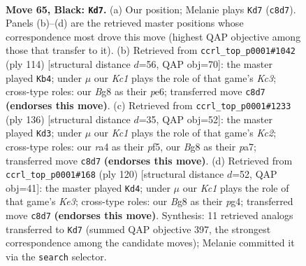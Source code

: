 \documentclass[11pt]{article}
\begin{document}
\clearpage

\begin{figure}[p]\centering
\begin{subfigure}{0.46\textwidth}\centering
\resizebox{\linewidth}{!}{%
\newchessgame
\chessboard[
  setfen={1rk3b1/p1p3r1/P1p3p1/2P2p1p/RP3P1P/6R1/5K2/1N6 b - - 53 65},
  showmover=false,
  pgfstyle=straightmove, color=movearrow, markmove={c8-d7}
]}
\caption{}
\end{subfigure}\hfill
\begin{subfigure}{0.46\textwidth}\centering
\resizebox{\linewidth}{!}{%
\newchessgame
\chessboard[
  setfen={r5r1/3pk3/4p1p1/4P2p/P2R1P1P/1PK3R1/8/8 w - - 11 58},
  showmover=false,
  pgfstyle=straightmove, color=movearrow, markmove={c3-b4}
]}
\caption{}
\end{subfigure}
\\[4pt]
\begin{subfigure}{0.46\textwidth}\centering
\resizebox{\linewidth}{!}{%
\newchessgame
\chessboard[
  setfen={8/p4k2/r1p1p3/1p2Pp2/1P1P2p1/P1R3P1/2K2P1r/5R2 w - - 6 69},
  showmover=false,
  pgfstyle=straightmove, color=movearrow, markmove={c2-d3}
]}
\caption{}
\end{subfigure}\hfill
\begin{subfigure}{0.46\textwidth}\centering
\resizebox{\linewidth}{!}{%
\newchessgame
\chessboard[
  setfen={8/2rk4/3p2p1/3P1p2/r1P1pPpP/PRR1K1P1/8/8 w - - 10 61},
  showmover=false,
  pgfstyle=straightmove, color=movearrow, markmove={e3-d4}
]}
\caption{}
\end{subfigure}
\caption{\textbf{Move 65, Black: \texttt{Kd7}.} (a) Our position; Melanie plays \texttt{Kd7} (\texttt{c8d7}). Panels (b)--(d) are the retrieved master positions whose correspondence most drove this move (highest QAP objective among those that transfer to it). (b) Retrieved from \texttt{ccrl\_top\_p0001\#1042} (ply 114) [structural distance $d$=56, QAP obj=70]: the master played \texttt{Kb4}; under $\mu$ our \emph{Kc1} plays the role of that game's \emph{Kc3}; cross-type roles: our \emph{B}g8 as their \emph{p}e6; transferred move \texttt{c8d7} \textbf{(endorses this move)}. (c) Retrieved from \texttt{ccrl\_top\_p0001\#1233} (ply 136) [structural distance $d$=35, QAP obj=52]: the master played \texttt{Kd3}; under $\mu$ our \emph{Kc1} plays the role of that game's \emph{Kc2}; cross-type roles: our \emph{r}a4 as their \emph{p}f5, our \emph{B}g8 as their \emph{p}a7; transferred move \texttt{c8d7} \textbf{(endorses this move)}. (d) Retrieved from \texttt{ccrl\_top\_p0001\#168} (ply 120) [structural distance $d$=52, QAP obj=41]: the master played \texttt{Kd4}; under $\mu$ our \emph{Kc1} plays the role of that game's \emph{Ke3}; cross-type roles: our \emph{B}g8 as their \emph{p}g4; transferred move \texttt{c8d7} \textbf{(endorses this move)}. Synthesis: 11 retrieved analogs transferred to \texttt{Kd7} (summed QAP objective 397, the strongest correspondence among the candidate moves); Melanie committed it via the \texttt{search} selector.}
\label{fig:thought-m129}
\end{figure}
\end{document}
